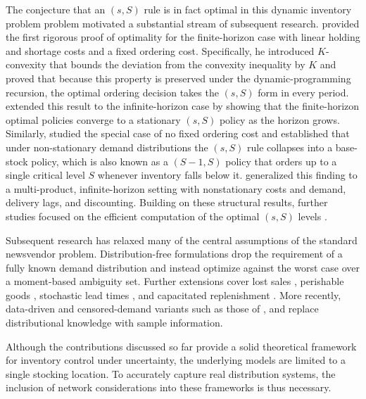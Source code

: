 The conjecture that an $(s, S)$ rule is in fact optimal in this dynamic inventory problem problem motivated a substantial stream of subsequent research. \citet{scarf1960sSoptimality} provided the first rigorous proof of optimality for the finite-horizon case with linear holding and shortage costs and a fixed ordering cost. Specifically, he introduced $K$-convexity that bounds the deviation from the convexity inequality by $K$ and proved that because this property is preserved under the dynamic-programming recursion, the optimal ordering decision takes the $(s, S)$ form in every period. \citet{iglehart1963sSoptimality} extended this result to the infinite-horizon case by showing that the finite-horizon optimal policies converge to a stationary $(s, S)$ policy as the horizon grows. Similarly, \citet{karlin1960sSoptimality} studied the special case of no fixed ordering cost and established that under non-stationary demand distributions the $(s, S)$ rule collapses into a base-stock policy, which is also known as a $(S-1, S)$ policy that orders up to a single critical level $S$ whenever inventory falls below it. \citet{veinott1965sSoptimality} generalized this finding to a multi-product, infinite-horizon setting with nonstationary costs and demand, delivery lags, and discounting. Building on these structural results, further studies focused on the efficient computation of the optimal $(s, S)$ levels \citep[e.g.,][]{veinott1965computingsS, federgruen1984computingsS, zheng1991computingsS}.

Subsequent research has relaxed many of the central assumptions of the standard newsvendor problem. Distribution-free formulations \citep[e.g.,][]{scarf1958distributionfree, gallego1993distributionfree, gallego2001distributionfree} drop the requirement of a fully known demand distribution and instead optimize against the worst case over a moment-based ambiguity set. Further extensions cover lost sales \citep{karlin1958lostsales},
perishable goods \citep{fries1975perishable, nahmias1975perishable}, stochastic lead times \citep{kaplan1970stochasticleadtimes}, and capacitated replenishment \citep{federgruen1986capacitatedreplenishment}. More recently, data-driven and censored-demand variants such as those of \citet{burnetas2000datadriven, levi2007datadriven}, and \citet{huh2009datadriven} replace distributional knowledge with sample information.

Although the contributions discussed so far provide a solid theoretical framework for inventory control under uncertainty, the underlying models are limited to a single stocking location. To accurately capture real distribution systems, the inclusion of network considerations into these frameworks is thus necessary.

